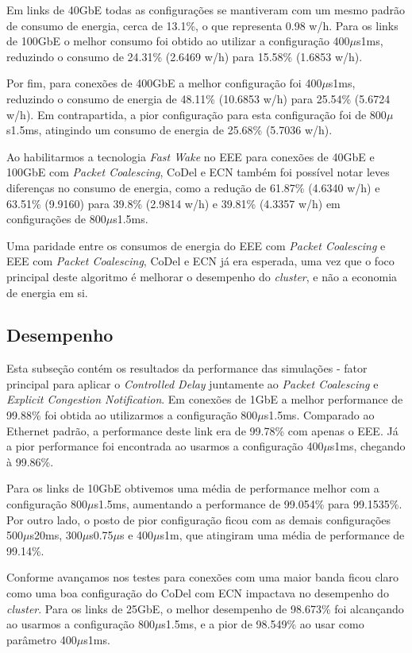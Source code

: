 Em links de 40GbE todas as configurações se mantiveram com um mesmo padrão de consumo de energia, cerca de 13.1\%, o que representa 0.98 w/h. Para os links de 100GbE o melhor consumo foi obtido ao utilizar a configuração 400$\mu$s1ms, reduzindo o consumo de 24.31\% (2.6469 w/h) para 15.58\% (1.6853 w/h).

Por fim, para conexões de 400GbE a melhor configuração foi 400$\mu$s1ms, reduzindo o consumo de energia de 48.11\% (10.6853 w/h) para 25.54\% (5.6724 w/h). Em contrapartida, a pior configuração para esta configuração foi de 800$\mu$s1.5ms, atingindo um consumo de energia de 25.68\% (5.7036 w/h).

Ao habilitarmos a tecnologia \emph{Fast Wake} no EEE para conexões de 40GbE e 100GbE com \emph{Packet Coalescing}, CoDel e ECN também foi possível notar leves diferenças no consumo de energia, como a redução de 61.87\% (4.6340 w/h) e 63.51\% (9.9160) para 39.8\% (2.9814 w/h) e 39.81\% (4.3357 w/h) em configurações de 800$\mu$s1.5ms.

Uma paridade entre os consumos de energia do EEE com \emph{Packet Coalescing} e EEE com \emph{Packet Coalescing}, CoDel e ECN já era esperada, uma vez que o foco principal deste algoritmo é melhorar o desempenho do \emph{cluster}, e não a economia de energia em si.


\subsection{Desempenho}

Esta subseção contém os resultados da performance das simulações - fator principal para aplicar o \emph{Controlled Delay} juntamente ao \emph{Packet Coalescing} e \emph{Explicit Congestion Notification}. Em conexões de 1GbE a melhor performance de 99.88\% foi obtida ao utilizarmos a configuração 800$\mu$s1.5ms. Comparado ao Ethernet padrão, a performance deste link era de 99.78\% com apenas o EEE. Já a pior performance foi encontrada ao usarmos a configuração 400$\mu$s1ms, chegando à 99.86\%.

Para os links de 10GbE obtivemos uma média de performance melhor com a configuração 800$\mu$s1.5ms, aumentando a performance de 99.054\% para 99.1535\%. Por outro lado, o posto de pior configuração ficou com as demais configurações 500$\mu$s20ms, 300$\mu$s0.75$\mu$s e 400$\mu$s1m, que atingiram uma média de performance de 99.14\%.

Conforme avançamos nos testes para conexões com uma maior banda ficou claro como uma boa configuração do CoDel com ECN impactava no desempenho do \emph{cluster}. Para os links de 25GbE, o melhor desempenho de 98.673\% foi alcançando ao usarmos a configuração 800$\mu$s1.5ms, e a pior de 98.549\% ao usar como parâmetro 400$\mu$s1ms.

